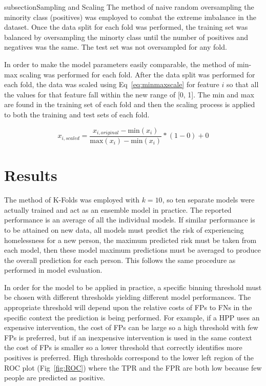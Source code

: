 \documentclass[10pt,letterpaper]{article}
\newcommand{\red}[1]{{\color{red}{#1}}}
\begin{document}
\*subsection{Sampling and Scaling}
The method of naive random oversampling the minority class (positives) was employed to combat the extreme imbalance in the dataset. Once the data split for each fold was performed, the training set was balanced by oversampling the minorty class until the number of positives and negatives was the same. The test set was not oversampled for any fold.

In order to make the model parameters easily comparable, the method of min-max scaling was performed for each fold. After the data split was performed for each fold, the data was scaled using Eq~\ref{eq:minmaxscale} for feature $i$ so that all the values for that feature fall within the new range of [0, 1]. The min and max are found in the training set of each fold and then the scaling process is applied to both the training and test sets of each fold.

\begin{equation}
    x_{i, scaled} = \frac{x_{i, original} - \text{min}(x_{i})}{\text{max}(x_{i}) - \text{min}(x_{i})}
    * (1 - 0) + 0
    \label{eq:minmaxscale}
\end{equation}

\section*{Results}
The method of K-Folds was employed with $k=10$, so ten separate models were actually trained and act as an ensemble model in practice. The reported performance is an average of all the individual models. If similar performance is to be attained on new data, all models must predict the risk of experiencing homelessness for a new person, the maximum predicted risk must be taken from each model, then these model maximum predictions must be averaged to produce the overall prediction for each person. This follows the same procedure as performed in model evaluation.

In order for the model to be applied in practice, a specific binning threshold must be chosen with different thresholds yielding different model performances. The appropriate threshold will depend upon the relative costs of FPs to FNs in the specific context the prediction is being performed. For example, if a HPP uses an expensive intervention, the cost of FPs can be large so a high threshold with few FPs is preferred, but if an inexpensive intervention is used in the same context the cost of FPs is smaller so a lower threshold that correctly identifies more positives is preferred. High thresholds correspond to the lower left region of the ROC plot (Fig~\ref{fig:ROC}) where the TPR and the FPR are both low because few people are predicted as positive. \red{remove this paragraph?}
\end{document}

